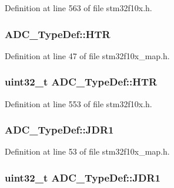 Definition at line 563 of file stm32f10x.\+h.

\subsubsection[{\texorpdfstring{H\+TR}{HTR}}]{ A\+D\+C\+\_\+\+Type\+Def\+::\+H\+TR}\hypertarget{struct_a_d_c___type_def_a19161bc033d10d065527872ad2b7fa58}{}\label{struct_a_d_c___type_def_a19161bc033d10d065527872ad2b7fa58}


Definition at line 47 of file stm32f10x\+\_\+map.\+h.

\subsubsection[{\texorpdfstring{H\+TR}{HTR}}]{ {\bf uint32\+\_\+t} A\+D\+C\+\_\+\+Type\+Def\+::\+H\+TR}\hypertarget{struct_a_d_c___type_def_a297ac2d83a1837bfdc0333474b977de0}{}\label{struct_a_d_c___type_def_a297ac2d83a1837bfdc0333474b977de0}


Definition at line 553 of file stm32f10x.\+h.

\subsubsection[{\texorpdfstring{J\+D\+R1}{JDR1}}]{ A\+D\+C\+\_\+\+Type\+Def\+::\+J\+D\+R1}\hypertarget{struct_a_d_c___type_def_a2d77acfa076b7be130ff5ebe63a686a8}{}\label{struct_a_d_c___type_def_a2d77acfa076b7be130ff5ebe63a686a8}


Definition at line 53 of file stm32f10x\+\_\+map.\+h.

\subsubsection[{\texorpdfstring{J\+D\+R1}{JDR1}}]{ {\bf uint32\+\_\+t} A\+D\+C\+\_\+\+Type\+Def\+::\+J\+D\+R1}\hypertarget{struct_a_d_c___type_def_ab4b0a79a9e4a9d5b0a24d7285cf55bdc}{}\label{struct_a_d_c___type_def_ab4b0a79a9e4a9d5b0a24d7285cf55bdc}


